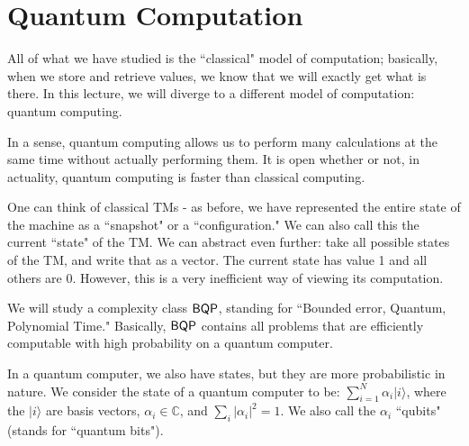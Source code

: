 \section{Quantum Computation}

All of what we have studied is the ``classical" model of computation; basically, when we store and retrieve values, we know that we will exactly get what is there. In this lecture, we will diverge to a different model of computation: quantum computing.

\par In a sense, quantum computing allows us to perform many calculations at the same time without actually performing them. It is open whether or not, in actuality, quantum computing is faster than classical computing. 

\par One can think of classical TMs - as before, we have represented the entire state of the machine as a ``snapshot" or a ``configuration." We can also call this the current ``state" of the TM. We can abstract even further: take all possible states of the TM, and write that as a vector. The current state has value 1 and all others are 0. However, this is a very inefficient way of viewing its computation.

\par We will study a complexity class ${\mathsf{BQP}}$, standing for ``Bounded error, Quantum, Polynomial Time." Basically, ${\mathsf{BQP}}$ contains all problems that are efficiently computable with high probability on a quantum computer. 

\newcommand{\ket}[1]{\ensuremath{\vert #1 \rangle}}

\par In a quantum computer, we also have states, but they are more probabilistic in nature. We consider the state of a quantum computer to be: $\sum_{i=1}^{N}\alpha_i \ket{i}$, where the $\ket{i}$ are basis vectors, $\alpha_i \in \mathbb{C}$, and $\sum_{i} |\alpha_i|^2 = 1$. We also call the $\alpha_i$ ``qubits" (stands for ``quantum bits").

